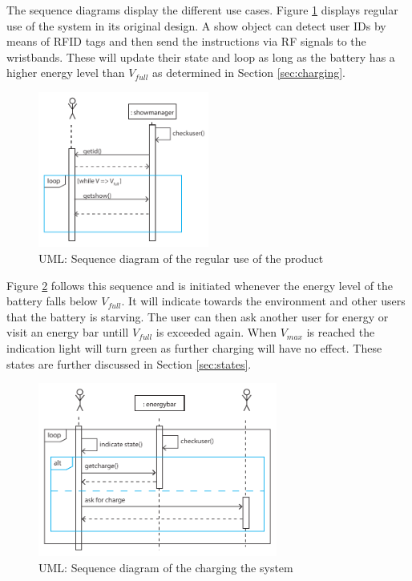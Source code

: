 The sequence diagrams display the different use cases. Figure \ref{fig:sequenceshow} displays regular use of the system in its original design. A show object can detect user IDs by means of RFID tags and then send the instructions via RF signals to the wristbands. These will update their state and loop as long as the battery has a higher energy level than $V_{full}$ as determined in Section \ref{sec:charging}.
%
\begin{figure}[h!]
\centering
\includegraphics[width=0.5\textwidth]{sequenceshow.pdf}
\caption{UML: Sequence diagram of the regular use of the product}
\label{fig:sequenceshow}
\end{figure}

Figure \ref{fig:sequencecharge} follows this sequence and is initiated whenever the energy level of the battery falls below $V_{full}$. It will indicate towards the environment and other users that the battery is starving. The user can then ask another user for energy or visit an energy bar untill $V_{full}$ is exceeded again. When $V_{max}$ is reached the indication light will turn green as further charging will have no effect. These states are further discussed in Section \ref{sec:states}.
%
\begin{figure}[h!]
\centering
\includegraphics[width=0.7\textwidth]{sequencecharge.pdf}
\caption{UML: Sequence diagram of the charging the system}
\label{fig:sequencecharge}
\end{figure}

